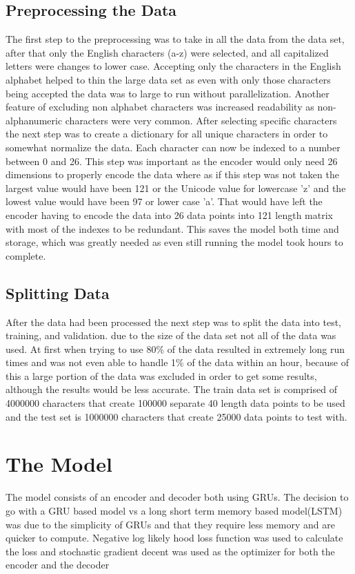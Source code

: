 \documentclass[conference]{IEEEtran}
\begin{document}
\subsection{Preprocessing the Data}
The first step to the preprocessing was to take in all the data from the data set, after that only the English characters (a-z) were selected, and all capitalized letters were changes to lower case. Accepting only the characters in the English alphabet helped to thin the large data set as even with only those characters being accepted the data was to large to run without parallelization. Another feature of excluding non alphabet characters was increased readability as non-alphanumeric characters were very common. After selecting specific characters the next step was to create a dictionary for all unique characters in order to somewhat normalize the data. Each character can now be indexed to a number between 0 and 26. This step was important as the encoder would only need 26 dimensions to properly encode the data where as if this step was not taken the largest value would have been 121 or the Unicode value for lowercase 'z' and the lowest value would have been 97 or lower case 'a'. That would have left the encoder having to encode the data into 26 data points into 121 length matrix with most of the indexes to be redundant. This saves the model both time and storage, which was greatly needed as even still running the model took hours to complete.

\subsection{Splitting Data}
After the data had been processed the next step was to split the data into test, training, and validation. due to the size of the data set not all of the data was used. At first when trying to use 80\% of the data resulted in extremely long run times and was not even able to handle 1\% of the data within an hour, because of this a large portion of the data was excluded in order to get some results, although the results would be less accurate. The train data set is comprised of 4000000 characters that create 100000 separate 40 length data points to be used and the test set is 1000000 characters that create 25000 data points to test with.

\section{The Model}
The model consists of an encoder and decoder both using GRUs. The decision to go with a GRU based model vs a long short term memory based model(LSTM) was due to the simplicity of GRUs and that they require less memory and are quicker to compute. Negative log likely hood loss function was used to calculate the loss and stochastic gradient decent was used as the optimizer for both the encoder and the decoder
\end{document}
